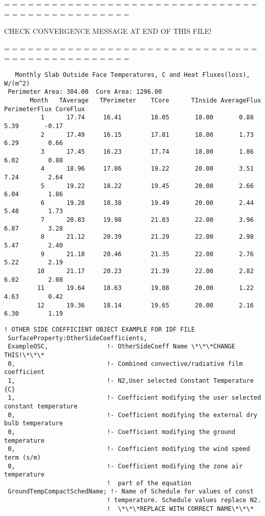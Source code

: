 = = = = = = = = = = = = = = = = = = = = = = = = = = = = = = = = = = = = = = = = = = = = = = = =

CHECK CONVERGENCE MESSAGE AT END OF THIS FILE!

= = = = = = = = = = = = = = = = = = = = = = = = = = = = = = = = = = = = = = = = = = = = = = = =

\begin{lstlisting}
   Monthly Slab Outside Face Temperatures, C and Heat Fluxes(loss), W/(m^2)
 Perimeter Area: 304.00  Core Area: 1296.00
       Month   TAverage   TPerimeter    TCore      TInside AverageFlux PerimeterFlux CoreFlux
          1      17.74     16.41        18.05       18.00       0.88        5.39       -0.17
          2      17.49     16.15        17.81       18.00       1.73        6.29        0.66
          3      17.45     16.23        17.74       18.00       1.86        6.02        0.88
          4      18.96     17.86        19.22       20.00       3.51        7.24        2.64
          5      19.22     18.22        19.45       20.00       2.66        6.04        1.86
          6      19.28     18.38        19.49       20.00       2.44        5.48        1.73
          7      20.83     19.98        21.03       22.00       3.96        6.87        3.28
          8      21.12     20.39        21.29       22.00       2.98        5.47        2.40
          9      21.18     20.46        21.35       22.00       2.76        5.22        2.19
         10      21.17     20.23        21.39       22.00       2.82        6.02        2.08
         11      19.64     18.63        19.88       20.00       1.22        4.63        0.42
         12      19.36     18.14        19.65       20.00       2.16        6.30        1.19
\end{lstlisting}

\begin{lstlisting}
! OTHER SIDE COEFFICIENT OBJECT EXAMPLE FOR IDF FILE
 SurfaceProperty:OtherSideCoefficients,
 ExampleOSC,                !- OtherSideCoeff Name \*\*\*CHANGE THIS!\*\*\*
 0,                         !- Combined convective/radiative film coefficient
 1,                         !- N2,User selected Constant Temperature {C}
 1,                         !- Coefficient modifying the user selected constant temperature
 0,                         !- Coefficient modifying the external dry bulb temperature
 0,                         !- Coefficient modifying the ground temperature
 0,                         !- Coefficient modifying the wind speed term (s/m)
 0,                         !- Coefficient modifying the zone air temperature
                            !  part of the equation
 GroundTempCompactSchedName; !- Name of Schedule for values of const
                            ! temperature. Schedule values replace N2.
                            !  \*\*\*REPLACE WITH CORRECT NAME\*\*\*
\end{lstlisting}

